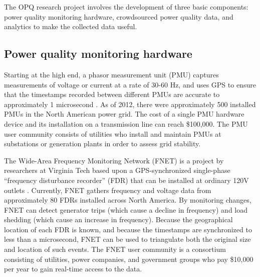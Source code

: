 \documentclass[11pt]{article}
\begin{document}

The OPQ research project involves the development of three basic components: power quality monitoring hardware, crowdsourced power quality data, and analytics to make the collected data useful. 

\subsection{Power quality monitoring hardware}
\label{sec:background-hardware}

Starting at the high end, a phasor measurement unit (PMU) captures measurements of voltage or current at a rate of 30-60 Hz, and uses GPS to ensure that the timestamps recorded between different PMUs are accurate to approximately 1 microsecond \cite{Zhang2007}. As of 2012, there were approximately 500 installed PMUs in the North American power grid. The cost of a single PMU hardware device and its installation on a transmission line can reach \$100,000. The PMU user community consists of utilities who install and maintain PMUs at substations or generation plants in order to assess grid stability.

The Wide-Area Frequency Monitoring Network (FNET) is a project by researchers at Virginia Tech based upon a GPS-synchronized single-phase ``frequency disturbance recorder'' (FDR) that can be installed at ordinary 120V outlets \cite{Zhang2010}. Currently, FNET gathers frequency and voltage data from approximately 80 FDRs installed across North America.  By monitoring changes, FNET can detect generator trips (which cause a decline in frequency) and load shedding (which cause an increase in frequency). Because the geographical location of each FDR is known, and because the timestamps are synchronized to less than a microsecond, FNET can be used to triangulate both the original size and location of such events. The FNET user community is a consortium consisting of utilities, power companies, and government groups who pay \$10,000 per year to gain real-time access to the data. 

\end{document}
